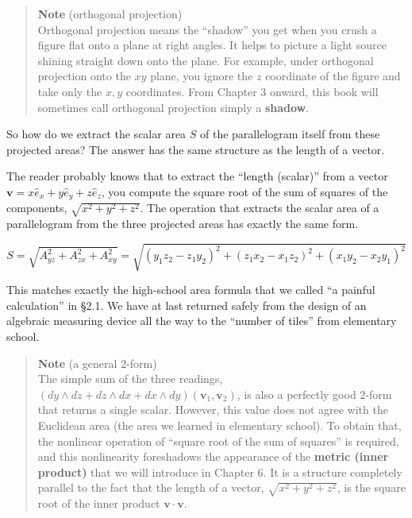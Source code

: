\begin{quote}
\textbf{Note} (orthogonal projection)\\
Orthogonal projection means the ``shadow'' you get when you crush a
figure flat onto a plane at right angles. It helps to picture a light
source shining straight down onto the plane. For example, under
orthogonal projection onto the \(xy\) plane, you ignore the \(z\)
coordinate of the figure and take only the \(x,y\) coordinates. From
Chapter 3 onward, this book will sometimes call orthogonal projection
simply a \textbf{shadow}.
\end{quote}

So how do we extract the scalar area \(S\) of the parallelogram itself
from these projected areas? The answer has the same structure as the
length of a vector.

The reader probably knows that to extract the ``length (scalar)'' from a
vector \(\mathbf{v} = x\hat{e}_x + y\hat{e}_y + z\hat{e}_z\), you
compute the square root of the sum of squares of the components,
\(\sqrt{x^2+y^2+z^2}\). The operation that extracts the scalar area of a
parallelogram from the three projected areas has exactly the same form.

\[S = \sqrt{A_{yz}^2 + A_{zx}^2 + A_{xy}^2} = \sqrt{(y_1 z_2 - z_1 y_2)^2 + (z_1 x_2 - x_1 z_2)^2 + (x_1 y_2 - x_2 y_1)^2}\]

This matches exactly the high-school area formula that we called ``a
painful calculation'' in §2.1. We have at last returned safely from the
design of an algebraic measuring device all the way to the ``number of
tiles'' from elementary school.

\begin{quote}
\textbf{Note} (a general \(2\)-form)\\
The simple sum of the three readings,
\((dy \wedge dz + dz \wedge dx + dx \wedge dy)(\mathbf{v}_1,\mathbf{v}_2)\),
is also a perfectly good \(2\)-form that returns a single scalar.
However, this value does not agree with the Euclidean area (the area we
learned in elementary school). To obtain that, the nonlinear operation
of ``square root of the sum of squares'' is required, and this
nonlinearity foreshadows the appearance of the
\textbf{metric (inner product)} that we will introduce in Chapter 6. It
is a structure completely parallel to the fact that the length of a
vector, \(\sqrt{x^2+y^2+z^2}\), is the square root of the inner product
\(\mathbf{v}\cdot\mathbf{v}\).
\end{quote}

